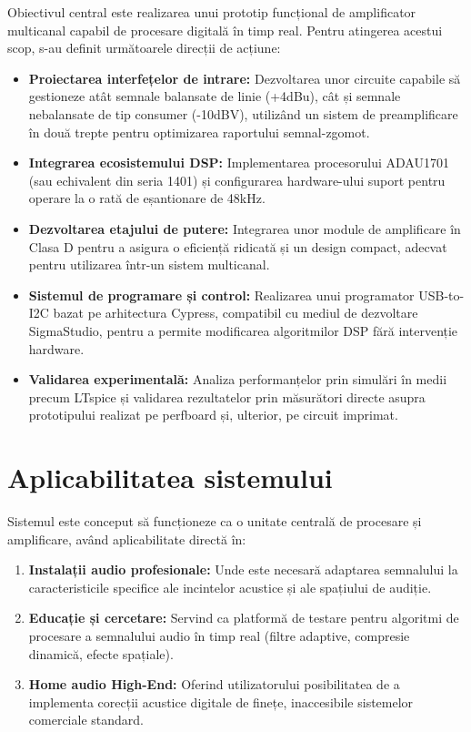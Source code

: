 Obiectivul central este realizarea unui prototip funcțional de amplificator multicanal capabil de procesare digitală în timp real. Pentru atingerea acestui scop, s-au definit următoarele direcții de acțiune:
\begin{itemize}
    \item \textbf{Proiectarea interfețelor de intrare:} Dezvoltarea unor circuite capabile să gestioneze atât semnale balansate de linie (+4dBu), cât și semnale nebalansate de tip consumer (-10dBV), utilizând un sistem de preamplificare în două trepte pentru optimizarea raportului semnal-zgomot.
    \item \textbf{Integrarea ecosistemului DSP:} Implementarea procesorului ADAU1701 (sau echivalent din seria 1401) și configurarea hardware-ului suport pentru operare la o rată de eșantionare de 48kHz.
    \item \textbf{Dezvoltarea etajului de putere:} Integrarea unor module de amplificare în Clasa D pentru a asigura o eficiență ridicată și un design compact, adecvat pentru utilizarea într-un sistem multicanal.
    \item \textbf{Sistemul de programare și control:} Realizarea unui programator USB-to-I2C bazat pe arhitectura Cypress, compatibil cu mediul de dezvoltare SigmaStudio, pentru a permite modificarea algoritmilor DSP fără intervenție hardware.
    \item \textbf{Validarea experimentală:} Analiza performanțelor prin simulări în medii precum LTspice și validarea rezultatelor prin măsurători directe asupra prototipului realizat pe perfboard și, ulterior, pe circuit imprimat.
\end{itemize}

\section*{Aplicabilitatea sistemului}

Sistemul este conceput să funcționeze ca o unitate centrală de procesare și amplificare, având aplicabilitate directă în:
\begin{enumerate}
    \item \textbf{Instalații audio profesionale:} Unde este necesară adaptarea semnalului la caracteristicile specifice ale incintelor acustice și ale spațiului de audiție.
    \item \textbf{Educație și cercetare:} Servind ca platformă de testare pentru algoritmi de procesare a semnalului audio în timp real (filtre adaptive, compresie dinamică, efecte spațiale).
    \item \textbf{Home audio High-End:} Oferind utilizatorului posibilitatea de a implementa corecții acustice digitale de finețe, inaccesibile sistemelor comerciale standard.
\end{enumerate}
